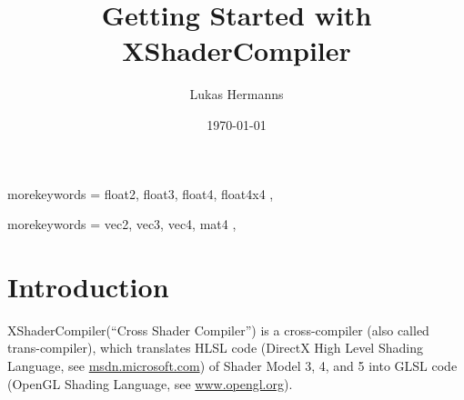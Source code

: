 \documentclass{article}
\title{Getting Started with XShaderCompiler}
\author{Lukas Hermanns}
\date{\today}
\begin{document}

\def\XSC{\textcolor{darkBlueColor}{XShaderCompiler}\xspace}


{
	morekeywords = {
		float2, float3, float4, float4x4 %
	},
}

{
	morekeywords = {
		vec2, vec3, vec4, mat4 %
	},
}

\maketitle


\newpage



\tableofcontents

\newpage



\section{Introduction}

\XSC (``Cross Shader Compiler'') is a cross-compiler (also called trans-compiler),
which translates HLSL code (DirectX High Level Shading Language,
see \href{https://msdn.microsoft.com/en-us/library/windows/desktop/bb509561(v=vs.85).aspx}{msdn.microsoft.com}) 
of Shader Model 3, 4, and 5 into GLSL code (OpenGL Shading Language,
see \href{https://www.opengl.org/wiki/OpenGL_Shading_Language}{www.opengl.org}).


\end{document}
